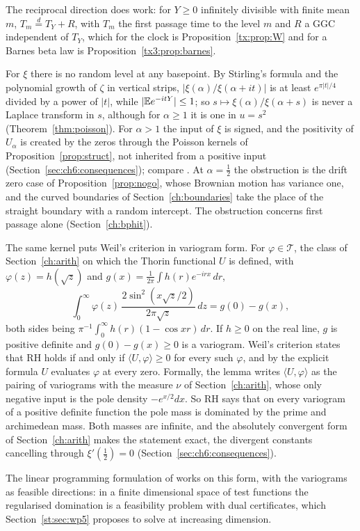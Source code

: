 The reciprocal direction does work: for $Y\ge0$ infinitely divisible with finite mean $m$, $T_m\overset d=T_Y+R$, with $T_m$ the first passage time to the level $m$ and $R$ a GGC independent of $T_Y$, which for the clock is Proposition~\ref{tx:prop:W} and for a Barnes beta law is Proposition~\ref{tx3:prop:barnes}.

For $\xi$ there is no random level at any basepoint. By Stirling's formula and the polynomial growth of $\zeta$ in vertical strips, $|\xi(\alpha)/\xi(\alpha+it)|$ is at least $e^{\pi|t|/4}$ divided by a power of $|t|$, while $|\mathbb{E} e^{-itY}|\le1$; so $s\mapsto\xi(\alpha)/\xi(\alpha+s)$ is never a Laplace transform in $s$, although for $\alpha\ge1$ it is one in $u=s^2$ (Theorem~\ref{thm:poisson}). For $\alpha>1$ the input of $\xi$ is signed, and the positivity of $U_\alpha$ is created by the zeros through the Poisson kernels of Proposition~\ref{prop:struct}, not inherited from a positive input (Section~\ref{sec:ch6:consequences}); compare \cite[Remark 3.8]{P26}. At $\alpha=\tfrac12$ the obstruction is the drift zero case of Proposition~\ref{prop:nogo}, whose Brownian motion has variance one, and the curved boundaries of Section~\ref{ch:boundaries} take the place of the straight boundary with a random intercept. The obstruction concerns first passage alone (Section~\ref{ch:bphit}).

The same kernel puts Weil's criterion in variogram form. For $\varphi\in\mathcal T$, the class of Section~\ref{ch:arith} on which the Thorin functional $U$ is defined, with $\varphi(z)=h(\sqrt z)$ and $g(x)=\frac1{2\pi}\int h(r)e^{-irx}\,dr$,
\begin{equation}\label{eq:ch10:variogram}
\int_0^\infty\varphi(z)\,\frac{2\sin^2(x\sqrt z/2)}{2\pi\sqrt z}\,dz=g(0)-g(x),
\end{equation}
both sides being $\pi^{-1}\int_0^\infty h(r)(1-\cos xr)\,dr$. If $h\ge0$ on the real line, $g$ is positive definite and $g(0)-g(x)\ge0$ is a variogram. Weil's criterion \cite{Weil52} states that RH holds if and only if $\langle U,\varphi\rangle\ge0$ for every such $\varphi$, and by the explicit formula $U$ evaluates $\varphi$ at every zero. Formally, the lemma writes $\langle U,\varphi\rangle$ as the pairing of variograms with the measure $\nu$ of Section~\ref{ch:arith}, whose only negative input is the pole density $-e^{x/2}dx$. So RH says that on every variogram of a positive definite function the pole mass is dominated by the prime and archimedean mass. Both masses are infinite, and the absolutely convergent form of Section~\ref{ch:arith} makes the statement exact, the divergent constants cancelling through $\xi'(\tfrac12)=0$ (Section~\ref{sec:ch6:consequences}).

The linear programming formulation of \cite[Sections 18.2.8 and 18.2.9]{P26} works on this form, with the variograms as feasible directions: in a finite dimensional space of test functions the regularised domination is a feasibility problem with dual certificates, which Section~\ref{st:sec:wp5} proposes to solve at increasing dimension.
